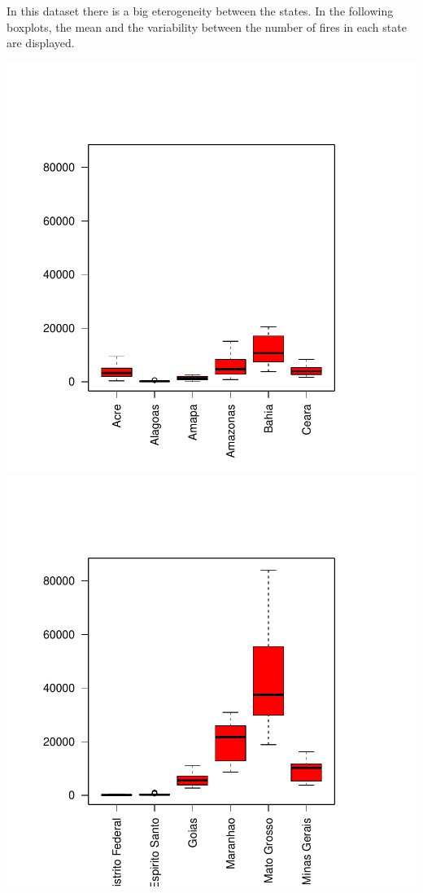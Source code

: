 \documentclass[]{article}
\begin{document}
In this dataset there is a big eterogeneity between the states. In the
following boxplots, the mean and the variability between the number of
fires in each state are displayed.

\begin{center}\includegraphics[width=.49\linewidth]{Data_science_project_files/figure-latex/unnamed-chunk-5-1} \includegraphics[width=.49\linewidth]{Data_science_project_files/figure-latex/unnamed-chunk-5-2} \end{center}
\end{document}
